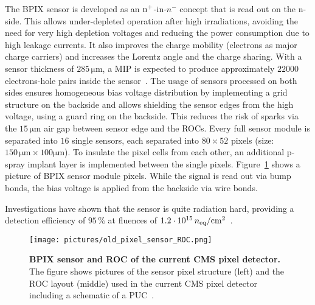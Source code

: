 The \acs{BPIX} sensor is developed as an $\rm{n^+}$-in-$n^{-}$ concept that is read out on the n-side. This allows under-depleted operation after high irradiations, avoiding the need for very high depletion voltages and reducing the power consumption due to high leakage currents. It also improves the charge mobility (electrons as major charge carriers) and increases the Lorentz angle and the charge sharing. With a sensor thickness of $285\,\si{\micro \meter}$, a \ac{MIP} is expected to produce approximately $22000$ electrons-hole pairs inside the sensor~\cite{Tin11}. The usage of sensors processed on both sides ensures homogeneous bias voltage distribution by implementing a grid structure on the backside and allows shielding the sensor edges from the high voltage, using a guard ring on the backside. This reduces the risk of sparks via the $15\,\si{\micro \meter}$ air gap between sensor edge and the \ac{ROC}s. Every full sensor module is separated into $16$ single sensors, each separated into $80\times 52$ pixels (size: $150\,\si{\micro \meter}\times 100\si{\micro \meter}$). To insulate the pixel cells from each other, an additional p-spray implant layer is implemented between the single pixels. Figure~\ref{fig:BPIX_sensor_and_ROC} shows a picture of \acs{BPIX} sensor module pixels. While the signal is read out via bump bonds, the bias voltage is applied from the backside via wire bonds.

Investigations have shown that the sensor is quite radiation hard, providing a detection efficiency of $95\,\%$ at fluences of $1.2\cdot 10^{15}\,n_{\rm{eq}}/\rm{cm}^2$~\cite{Erd09}.

\begin{figure}
\begin{center}
\texttt{[image: pictures/old\_pixel\_sensor\_ROC.png]}
\end{center}
\caption[BPIX sensor and ROC of the current CMS pixel detector]{\textbf{\acs{BPIX} sensor and \ac{ROC} of the current \ac{CMS} pixel detector.} The figure shows pictures of the sensor pixel structure (left) and the \ac{ROC} layout (middle) used in the current \ac{CMS} pixel detector including a schematic of a \acl{PUC}~\cite{Erd09}.}\label{fig:BPIX_sensor_and_ROC}
\end{figure}

